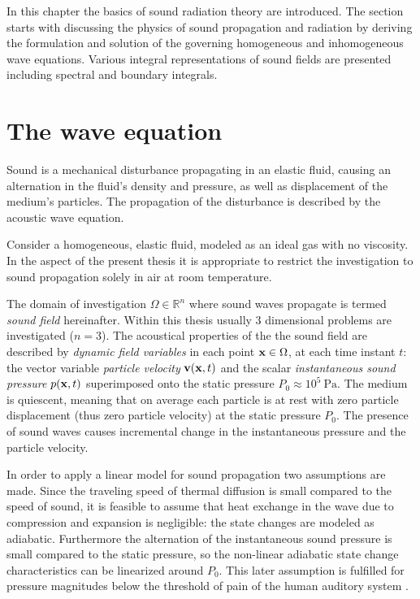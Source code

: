 In this chapter the basics of sound radiation theory are introduced.
The section starts with discussing the physics of sound propagation and radiation by deriving the formulation and solution of the governing homogeneous and inhomogeneous wave equations. 
Various integral representations of sound fields are presented including spectral and boundary integrals.
%

\section{The wave equation}

Sound is a mechanical disturbance propagating in an elastic fluid, causing an alternation in the fluid's density and pressure, as well as displacement of the medium's particles.
The propagation of the disturbance is described by the acoustic wave equation.

Consider a homogeneous, elastic fluid, modeled as an ideal gas with no viscosity. 
In the aspect of the present thesis it is appropriate to restrict the investigation to sound propagation solely in air at room temperature.

The domain of investigation $\Omega \in \mathbb{R}^n$ where sound waves propagate is termed \emph{sound field} hereinafter.
Within this thesis usually 3 dimensional problems are investigated ($n = 3$).
The acoustical properties of the the sound field are described by \emph{dynamic field variables} in each point $\mathbf{x} \in \Omega$, at each time instant $t$: the vector variable \emph{particle velocity} $\mathbf{v}(\mathbf{x},t)$ and the scalar \emph{instantaneous sound pressure} $p(\mathbf{x},t)$ superimposed onto the static pressure $P_0 \approx 10^5~\mathrm{Pa}$.
The medium is quiescent, meaning that on average each particle is at rest with zero particle displacement (thus zero particle velocity) at the static pressure $P_0$. 
The presence of sound waves causes incremental change in the instantaneous pressure and the particle velocity.

In order to apply a linear model for sound propagation two assumptions are made.
Since the traveling speed of thermal diffusion is small compared to the speed of sound, it is feasible to assume that heat exchange in the wave due to compression and expansion is negligible: the state changes are modeled as adiabatic.
Furthermore the alternation of the instantaneous sound pressure is small compared to the static pressure, so the non-linear adiabatic state change characteristics can be linearized around $P_0$.
This later assumption is fulfilled for pressure magnitudes below the threshold of pain of the human auditory system \cite{Gumerov2004, Ahrens2012}.

